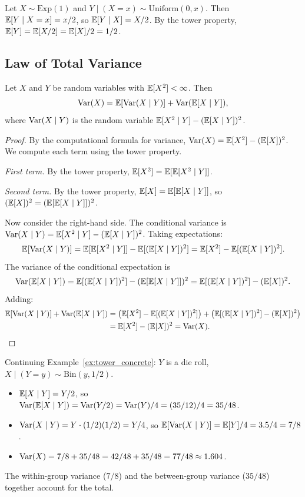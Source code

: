 \documentclass[11pt,a4paper]{article}
\begin{document}
\begin{example}
\label{ex:cond_exp_continuous}
Let $X \sim \mathrm{Exp}(1)$ and $Y \mid (X = x) \sim
\mathrm{Uniform}(0, x)$. Then
$\mathbb{E}[Y \mid X = x] = x/2$, so $\mathbb{E}[Y \mid X] = X/2$.
By the tower property,
$\mathbb{E}[Y] = \mathbb{E}[X/2] = \mathbb{E}[X]/2 = 1/2$.
\end{example}

\subsection{Law of Total Variance}

\begin{theorem}
\label{thm:total_variance}
Let $X$ and $Y$ be random variables with $\mathbb{E}[X^2] < \infty$. Then
\[
    \operatorname{Var}(X) = \mathbb{E}[\operatorname{Var}(X \mid Y)] + \operatorname{Var}(\mathbb{E}[X \mid Y]),
\]
where $\operatorname{Var}(X \mid Y)$ is the random variable
$\mathbb{E}[X^2 \mid Y] - (\mathbb{E}[X \mid Y])^2$.
\end{theorem}

\begin{proof}
By the computational formula for variance,
$\operatorname{Var}(X) = \mathbb{E}[X^2] - (\mathbb{E}[X])^2$.
We compute each term using the tower property.

\emph{First term.} By the tower property,
$\mathbb{E}[X^2] = \mathbb{E}[\mathbb{E}[X^2 \mid Y]]$.

\emph{Second term.} By the tower property,
$\mathbb{E}[X] = \mathbb{E}[\mathbb{E}[X \mid Y]]$, so $(\mathbb{E}[X])^2 = (\mathbb{E}[\mathbb{E}[X \mid Y]])^2$.

Now consider the right-hand side. The conditional variance is
$\operatorname{Var}(X \mid Y) = \mathbb{E}[X^2 \mid Y] - (\mathbb{E}[X \mid Y])^2$. Taking
expectations:
\[
    \mathbb{E}[\operatorname{Var}(X \mid Y)] = \mathbb{E}[\mathbb{E}[X^2 \mid Y]] - \mathbb{E}[(\mathbb{E}[X \mid Y])^2]
    = \mathbb{E}[X^2] - \mathbb{E}[(\mathbb{E}[X \mid Y])^2].
\]
The variance of the conditional expectation is
\[
    \operatorname{Var}(\mathbb{E}[X \mid Y]) = \mathbb{E}[(\mathbb{E}[X \mid Y])^2] - (\mathbb{E}[\mathbb{E}[X \mid Y]])^2
    = \mathbb{E}[(\mathbb{E}[X \mid Y])^2] - (\mathbb{E}[X])^2.
\]
Adding:
\begin{align*}
    \mathbb{E}[\operatorname{Var}(X \mid Y)] + \operatorname{Var}(\mathbb{E}[X \mid Y])
    &= \bigl(\mathbb{E}[X^2] - \mathbb{E}[(\mathbb{E}[X \mid Y])^2]\bigr)
    + \bigl(\mathbb{E}[(\mathbb{E}[X \mid Y])^2] - (\mathbb{E}[X])^2\bigr) \\
    &= \mathbb{E}[X^2] - (\mathbb{E}[X])^2 = \operatorname{Var}(X). \qedhere
\end{align*}
\end{proof}

\begin{example}
\label{ex:total_variance}
Continuing Example~\ref{ex:tower_concrete}: $Y$ is a die roll,
$X \mid (Y = y) \sim \mathrm{Bin}(y, 1/2)$.
\begin{itemize}[nosep]
    \item $\mathbb{E}[X \mid Y] = Y/2$, so $\operatorname{Var}(\mathbb{E}[X \mid Y])
    = \operatorname{Var}(Y/2) = \operatorname{Var}(Y)/4 = (35/12)/4 = 35/48$.
    \item $\operatorname{Var}(X \mid Y) = Y \cdot (1/2)(1/2) = Y/4$, so
    $\mathbb{E}[\operatorname{Var}(X \mid Y)] = \mathbb{E}[Y]/4 = 3.5/4 = 7/8$.
    \item $\operatorname{Var}(X) = 7/8 + 35/48 = 42/48 + 35/48 = 77/48 \approx 1.604$.
\end{itemize}
The within-group variance ($7/8$) and the between-group variance
($35/48$) together account for the total.
\end{example}
\end{document}
